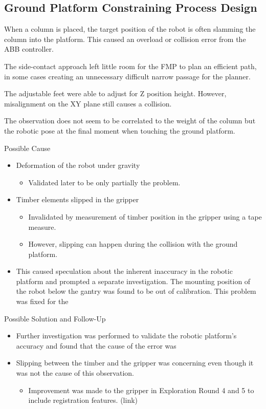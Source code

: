 \subsection{Ground Platform Constraining Process Design}
\label{subsection:exploration-2-ground-platform-constraining-process-design}

When a column is placed, the target position of the robot is often slamming the column into the platform. This caused an overload or collision error from the ABB controller.

The side-contact approach left little room for the FMP to plan an efficient path, in some cases creating an unnecessary difficult narrow passage for the planner.


The adjustable feet were able to adjust for Z position height. However, misalignment on the XY plane still causes a collision.

The observation does not seem to be correlated to the weight of the column but the robotic pose at the final moment when touching the ground platform.

Possible Cause
\begin{itemize}
    \item Deformation of the robot under gravity
    \begin{itemize}
        \item Validated later to be only partially the problem. 
    \end{itemize}
    \item Timber elements slipped in the gripper
    \begin{itemize}
        \item Invalidated by measurement of timber position in the gripper using a tape measure. 
        \item However, slipping can happen during the collision with the ground platform.
    \end{itemize}
    \item This caused speculation about the inherent inaccuracy in the robotic platform and prompted a separate investigation. The mounting position of the robot below the gantry was found to be out of calibration. This problem was fixed for the 
\end{itemize}

Possible Solution and Follow-Up
\begin{itemize}
    \item Further investigation was performed to validate the robotic platform’s accuracy and found that the cause of the error was 
    \item Slipping between the timber and the gripper was concerning even though it was not the cause of this observation. 
    \begin{itemize}
        \item Improvement was made to the gripper in Exploration Round 4 and 5 to include registration features. (link)
    \end{itemize}
\end{itemize}


